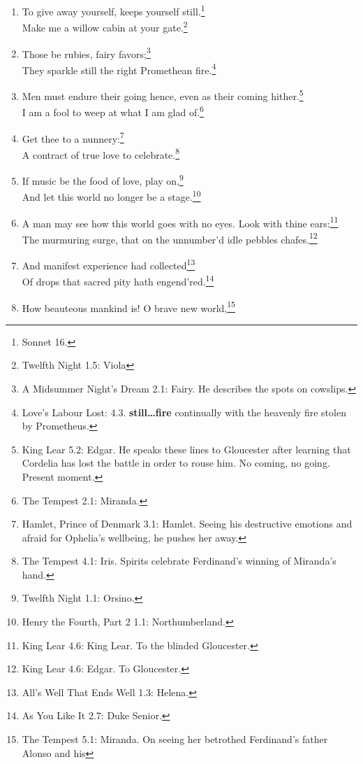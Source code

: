\documentclass[17pt,twoside]{extarticle}
\begin{document}
\begin{enumerate}
  fantastical.\footnote{Twelfth Night 1.1: Duke Orsino. He sees the
    fleeting nature of romantic love.}
\item
  To give away yourself, keeps yourself still.\footnote{Sonnet 16.}\\Make
  me a willow cabin at your gate.\footnote{Twelfth Night 1.5: Viola}
\item
  Those be rubies, fairy favors;\footnote{A Midsummer Night's Dream 2.1:
    Fairy. He describes the spots on cowslips.}\\They sparkle still the
  right Promethean fire.\footnote{Love's Labour Lost: 4.3.
    \textbf{still\ldots{}fire} continually with the heavenly fire stolen
    by Prometheus.}
\item
  Men must endure their going hence, even as their coming
  hither.\footnote{King Lear 5.2: Edgar. He speaks these lines to
    Gloucester after learning that Cordelia has lost the battle in order
    to rouse him. No coming, no going. Present moment.}\\I am a fool to
  weep at what I am glad of.\footnote{The Tempest 2.1: Miranda.}
\item
  Get thee to a nunnery:\footnote{Hamlet, Prince of Denmark 3.1: Hamlet.
    Seeing his destructive emotions and afraid for Ophelia's wellbeing,
    he pushes her away.}\\A contract of true love to
  celebrate.\footnote{The Tempest 4.1: Iris. Spirits celebrate
    Ferdinand's winning of Miranda's hand.}
\item
  If music be the food of love, play on,\footnote{Twelfth Night 1.1:
    Orsino.}\\And let this world no longer be a stage.\footnote{Henry
    the Fourth, Part 2 1.1: Northumberland.}
\item
  A man may see how this world goes with no eyes. Look with thine
  ears:\footnote{King Lear 4.6: King Lear. To the blinded Gloucester.}\\The
  murmuring surge, that on the unnumber'd idle pebbles chafes.\footnote{King
    Lear 4.6: Edgar. To Gloucester.}
\item
  And manifest experience had collected\footnote{All's Well That Ends
    Well 1.3: Helena.}\\Of drops that sacred pity hath
  engend'red.\footnote{As You Like It 2.7: Duke Senior.}
\item
  How beauteous mankind is! O brave new world,\footnote{The Tempest 5.1:
    Miranda. On seeing her betrothed Ferdinand's father Alonso and his
}
\end{enumerate}
\end{document}
